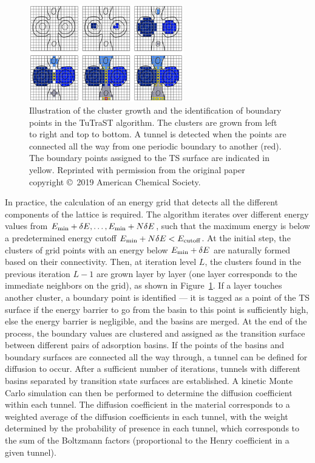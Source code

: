 \documentclass[main]{subfiles}
\begin{document}
\begin{figure}[ht]
  \centering
    \includegraphics[width=0.6\textwidth]{figures/5-diffusion/tutrast.jpg}
    \caption{ Illustration of the cluster growth and the identification of boundary points in the TuTraST algorithm\autocite{Mace_2019}. The clusters are grown from left to right and top to bottom. A tunnel is detected when the points are connected all the way from one periodic boundary to another (red). The boundary points assigned to the TS surface are indicated in yellow. Reprinted with permission from the original paper~\cite{Mace_2019} copyright \copyright\ 2019 American Chemical Society. }\label{fgr:tutrast}
\end{figure}

In practice, the calculation of an energy grid that detects all the different components of the lattice is required. The algorithm iterates over different energy values from $E_{\text{min}}+\delta E, \ldots, E_{\text{min}}+N\delta E$, such that the maximum energy is below a predetermined energy cutoff $E_{\text{min}}+N\delta E<E_{\text{cutoff}}$. At the initial step, the clusters of grid points with an energy below $E_{\text{min}}+\delta E$ are naturally formed based on their connectivity. Then, at iteration level $L$, the clusters found in the previous iteration $L-1$ are grown layer by layer (one layer corresponds to the immediate neighbors on the grid), as shown in Figure~\ref{fgr:tutrast}. If a layer touches another cluster, a boundary point is identified --- it is tagged as a point of the TS surface if the energy barrier to go from the basin to this point is sufficiently high, else the energy barrier is negligible, and the basins are merged. At the end of the process, the boundary values are clustered and assigned as the transition surface between different pairs of adsorption basins. If the points of the basins and boundary surfaces are connected all the way through, a tunnel can be defined for diffusion to occur. After a sufficient number of iterations, tunnels with different basins separated by transition state surfaces are established. A kinetic Monte Carlo simulation can then be performed to determine the diffusion coefficient within each tunnel. The diffusion coefficient in the material corresponds to a weighted average of the diffusion coefficients in each tunnel, with the weight determined by the probability of presence in each tunnel, which corresponds to the sum of the Boltzmann factors (proportional to the Henry coefficient in a given tunnel).
\end{document}
